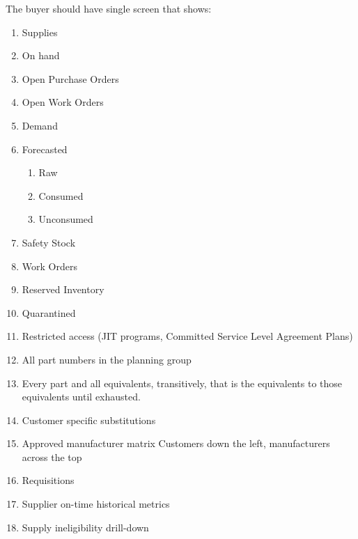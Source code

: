 \documentclass[letterpaper,10pt,english]{sphinxmanual}
\begin{document}
The buyer should have single screen that shows:
\begin{enumerate}
\item {} 
Supplies

\item {} 
On hand

\item {} 
Open Purchase Orders

\item {} 
Open Work Orders

\item {} 
Demand

\item {} 
Forecasted
\begin{enumerate}
\item {} 
Raw

\item {} 
Consumed

\item {} 
Unconsumed

\end{enumerate}

\item {} 
Safety Stock

\item {} 
Work Orders

\item {} 
Reserved Inventory

\item {} 
Quarantined

\item {} 
Restricted access (JIT programs, Committed Service Level Agreement
Plans)

\item {} 
All part numbers in the planning group

\item {} 
Every part and all equivalents, transitively, that is the equivalents
to those equivalents until exhausted.

\item {} 
Customer specific substitutions

\item {} 
Approved manufacturer matrix Customers down the left, manufacturers
across the top

\item {} 
Requisitions

\item {} 
Supplier on-time historical metrics

\item {} 
Supply ineligibility drill-down


\end{enumerate}
\end{document}
